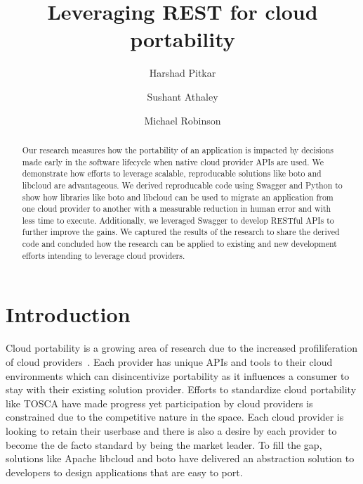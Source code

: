 % 
\title{Leveraging REST for cloud portability}

\author{Harshad Pitkar}

\author{Sushant Athaley}

\author{Michael Robinson}


\renewcommand{\shortauthors}{H. Pitkar, S. Athaley, M. Robinson}


\begin{abstract}
Our research measures how the portability of an application is impacted by
decisions made early in the software lifecycle when native cloud provider APIs
are used. We demonstrate how efforts to leverage scalable, reproducable
solutions like boto and libcloud are advantageous. We derived reproducable code
using Swagger and Python to show how libraries like boto and libcloud can be 
used to migrate an application from one cloud provider to another with a
measurable reduction in human error and with less  time to execute.
Additionally, we leveraged Swagger to develop RESTful APIs to  further improve
the gains. We captured the results of the research to share the derived code
and
concluded how the research can be applied to existing and new development
efforts intending to leverage cloud providers. 
\end{abstract}


\maketitle

\section{Introduction}\label{introduction}

Cloud portability is a growing area of research due to the increased
profiliferation of cloud providers~\cite{hid-sp18-518-Cloud-Council}. Each
provider has unique APIs and tools to their cloud environments  which can
disincentivize portability as it influences a consumer to stay with their
existing solution provider. Efforts to standardize cloud portability like TOSCA
have made progress yet participation by cloud providers is constrained due to
the competitive nature in the space. Each cloud provider is looking to retain
their userbase and there is also a desire by each provider to become the de
facto standard by being the market leader. To fill the gap, solutions like
Apache libcloud and boto have delivered an abstraction solution to developers
to
design applications that are easy to port.

